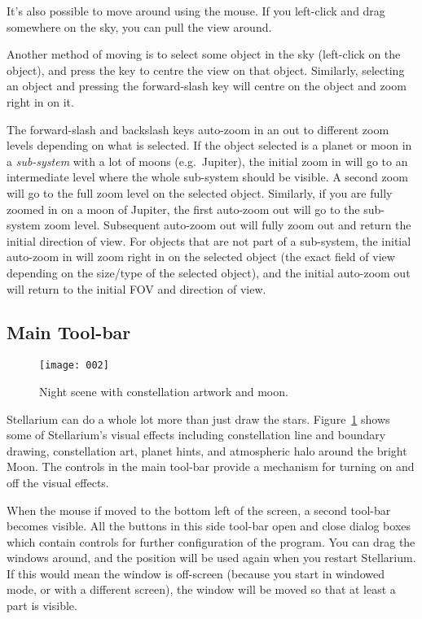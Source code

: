 It's also possible to move around using the mouse. If you left-click and
drag somewhere on the sky, you can pull the view around.

Another method of moving is to select some object in the sky (left-click
on the object), and press the  key to centre the view on that
object. Similarly, selecting an object and pressing the forward-slash
key \key{/} will centre on the object and zoom right in on it.

The forward-slash \key{/} and backslash \key{\textbackslash} keys auto-zoom in an out to different
zoom levels depending on what is selected. If the object selected is a planet
or moon in a \emph{sub-system} with a lot of moons (e.g.\ Jupiter), the
initial zoom in will go to an intermediate level where the whole
sub-system should be visible. A second zoom will go to the full zoom
level on the selected object. Similarly, if you are fully zoomed in on a
moon of Jupiter, the first auto-zoom out will go to the sub-system zoom
level. Subsequent auto-zoom out will fully zoom out and return the
initial direction of view. For objects that are not part of a
sub-system, the initial auto-zoom in will zoom right in on the selected
object (the exact field of view depending on the size/type of the
selected object), and the initial auto-zoom out will return to the
initial FOV and direction of view.

\subsection{Main Tool-bar}
\label{sec:interface:toolbar}

\begin{figure}[htb]
\centering\texttt{[image: 002]}
\caption{Night scene with constellation artwork and moon.}
\label{fig:002}
\end{figure}

Stellarium can do a whole lot more than just draw the stars. Figure~\ref{fig:002}
shows some of Stellarium's visual effects including constellation
line and boundary drawing, constellation art, planet hints, and
atmospheric halo around the bright Moon. The controls in the main tool-bar
provide a mechanism for turning on and off the visual effects.

When the mouse if moved to the bottom left of the screen, a second
tool-bar becomes visible. All the buttons in this side tool-bar open
and close dialog boxes which contain controls for further
configuration of the program.  You can drag the
windows around, and the position will be used again when you restart
Stellarium. If this would mean the window is off-screen (because you
start in windowed mode, or with a different screen), the window will
be moved so that at least a part is visible.

